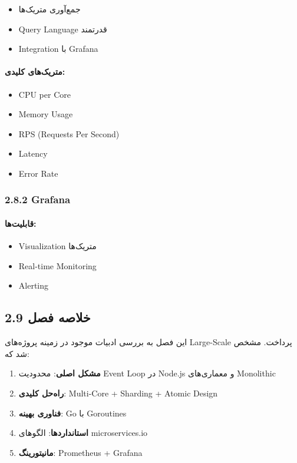 \documentclass[
]{article}
\providecommand{\tightlist}{%
  \setlength{\itemsep}{0pt}\setlength{\parskip}{0pt}}
\begin{document}
\begin{itemize}
\tightlist
\item
  جمع‌آوری متریک‌ها
\item
  Query Language قدرتمند
\item
  Integration با Grafana
\end{itemize}

\paragraph{متریک‌های
کلیدی:}\label{ux645ux62aux631ux6ccux6a9ux647ux627ux6cc-ux6a9ux644ux6ccux62fux6cc}

\begin{itemize}
\tightlist
\item
  CPU per Core
\item
  Memory Usage
\item
  RPS (Requests Per Second)
\item
  Latency
\item
  Error Rate
\end{itemize}

\subsubsection{2.8.2 Grafana}\label{grafana}

\paragraph{قابلیت‌ها:}\label{ux642ux627ux628ux644ux6ccux62aux647ux627}

\begin{itemize}
\tightlist
\item
  Visualization متریک‌ها
\item
  Real-time Monitoring
\item
  Alerting
\end{itemize}

\subsection{2.9 خلاصه
فصل}\label{ux62eux644ux627ux635ux647-ux641ux635ux644}

این فصل به بررسی ادبیات موجود در زمینه پروژه‌های Large-Scale پرداخت. مشخص
شد که:

\begin{enumerate}
\def\labelenumi{\arabic{enumi}.}
\tightlist
\item
  \textbf{مشکل اصلی}: محدودیت Event Loop در Node.js و معماری‌های
  Monolithic
\item
  \textbf{راه‌حل کلیدی}: Multi-Core + Sharding + Atomic Design
\item
  \textbf{فناوری بهینه}: Go با Goroutines
\item
  \textbf{استانداردها}: الگوهای microservices.io
\item
  \textbf{مانیتورینگ}: Prometheus + Grafana
\end{enumerate}
\end{document}
